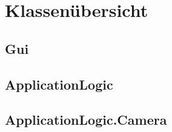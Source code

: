 \section{Klassenübersicht}

\subsection{Gui}

\newpage


\newpage


\newpage


\newpage


\newpage


\newpage


\newpage

\subsection{ApplicationLogic}

\newpage


\newpage


\newpage


\newpage


\newpage

\subsection{ApplicationLogic.Camera}

\newpage


\newpage